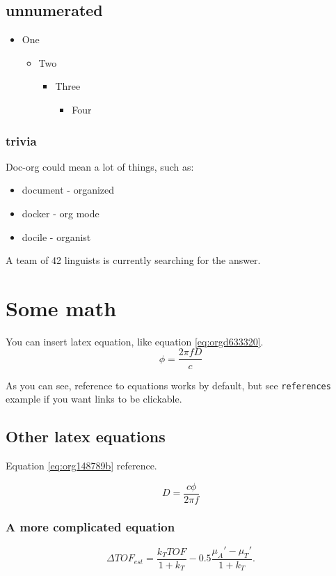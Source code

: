 \subsection{unnumerated}
\label{sec:orga4c3985}
\begin{itemize}
\item One
\begin{itemize}
\item Two
\begin{itemize}
\item Three
\begin{itemize}
\item Four
\end{itemize}
\end{itemize}
\end{itemize}
\end{itemize}

\subsubsection{trivia}
\label{sec:orgde9660e}
Doc-org could mean a lot of things, such as:
\begin{itemize}
\item document - organized
\item docker - org mode
\item docile - organist
\end{itemize}
A team of 42 linguists is currently searching for the answer.

\section{Some math}
\label{sec:org91998c7}
You can insert latex equation, like equation \ref{eq:orgd633320}.
\begin{equation}
\label{eq:orgd633320}
\phi = \frac{2\pi fD}{c}
\end{equation}

As you can see, reference to equations works by default, but see \texttt{references}
example if you want links to be clickable.

\subsection{Other latex equations}
\label{sec:org59416d2}
Equation \ref{eq:org148789b} reference.

\begin{equation}
\label{eq:org148789b}
D = \frac{c\phi}{2\pi f}
\end{equation}

\subsubsection{A more complicated equation}
\label{sec:orgc695f28}

\begin{equation}
\Delta TOF_{est} = \frac{k_T TOF}{1+k_T } - 0.5 \frac{\mu_A' - \mu_T'}{1+k_T}.
\end{equation}


